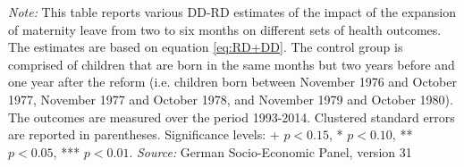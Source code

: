 \begin{landscape}
\begin{table}[htp]
\begin{adjustwidth}{-2cm}{}
\begin{minipage}{1.7\textwidth} %
{\footnotesize \textit{Note:} This table reports various DD-RD estimates of the impact of the expansion of maternity leave from two to six months on different sets of health outcomes. The estimates are based on equation \ref{eq:RD+DD}. The control group is comprised of children that are born in the same months but two years before and one year after the reform (i.e. children born between November 1976 and October 1977, November 1977 and October 1978, and November 1979 and October 1980). The outcomes are measured over the period 1993-2014.  \newline
Clustered standard errors are reported in parentheses. Significance levels: + \(p<0.15\), * \(p<0.10\), ** \(p<0.05\), *** \(p<0.01\). \newline \textit{Source: }German Socio-Economic Panel, version 31\par}
\end{minipage}
 \end{adjustwidth}

\end{table}

\end{landscape}



